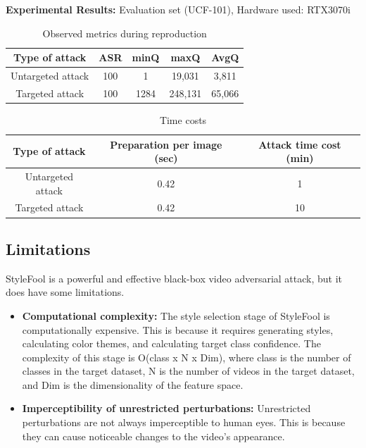 \textbf{Experimental Results: }
Evaluation set (UCF-101), Hardware used: RTX3070i

\begin{table}[H]
\centering
\begin{tabular}{|c|c|c|c|c|}
\hline
\textbf{Type of attack} & \textbf{ASR} & \textbf{minQ} & \textbf{maxQ} & \textbf{AvgQ}\\
\hline
Untargeted attack & 100 & 1 & 19,031 & 3,811 \\
\hline 
Targeted attack & 100 & 1284 & 248,131 & 65,066 \\
 \hline
\end{tabular}
\caption{Observed metrics during reproduction}
\label{tab:Table1}
\end{table}

\begin{table}[H]
\centering
\begin{tabular}{|c|c|c|}
\hline
\textbf{Type of attack} & \textbf{Preparation per image (sec)} & \textbf{Attack time cost (min)} \\
\hline
Untargeted attack & 0.42 & 1  \\
\hline 
Targeted attack & 0.42 & 10 \\
 \hline
\end{tabular}
\caption{Time costs}
\label{tab:Table1}
\end{table}

\subsection{Limitations}
StyleFool is a powerful and effective black-box video adversarial attack, but it does have some limitations.

\begin{itemize}
    \item \textbf{Computational complexity:} The style selection stage of StyleFool is computationally expensive. This is because it requires generating styles, calculating color themes, and calculating target class confidence. The complexity of this stage is O(class x N x Dim), where class is the number of classes in the target dataset, N is the number of videos in the target dataset, and Dim is the dimensionality of the feature space.
    \item \textbf{Imperceptibility of unrestricted perturbations:} Unrestricted perturbations are not always imperceptible to human eyes. This is because they can cause noticeable changes to the video's appearance.
\end{itemize}

